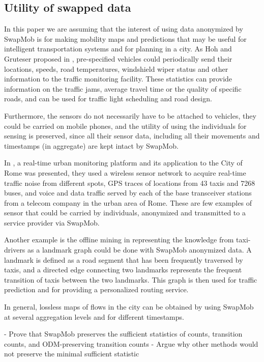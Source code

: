 \documentclass{llncs}
\begin{document}
\subsection{Utility of swapped data}\label{sect:util}
In this paper we are assuming that the interest of using data anonymized by SwapMob is for making mobility maps and predictions that may be useful for intelligent transportation systems and for planning in a city.
As Hoh and Gruteser proposed in \cite{Hoh2005}, pre-specified vehicles could periodically send their locations, speeds, road temperatures, windshield wiper status and other information to the traffic monitoring facility. These statistics can provide information on the traffic jams, average travel time or the quality of specific roads, and can be used for traffic light scheduling and road design.

Furthermore, the sensors do not necessarily have to be attached to vehicles, they could be carried on mobile phones, and the utility of using the individuals for sensing is preserved, since all their sensor data, including all their movements and timestamps (in aggregate) are kept intact by SwapMob.


In \cite{Calabrese2011}, a real-time urban monitoring platform and its application to the City of Rome was presented, they used
a wireless sensor network to acquire real-time traffic noise from different spots, GPS traces of locations from 43 taxis and 7268 buses, and voice and data traffic served by each of the base transceiver stations from a telecom company in the urban area of Rome. These are few examples of sensor that could be carried by individuals, anonymized and transmitted to a service provider via SwapMob.


Another example is the offline mining in \cite{Yuan2011} representing the knowledge from taxi-drivers as a landmark graph could be done with SwapMob anonymized data. A landmark is defined as a road segment that has been frequently traversed by taxis, and a directed edge connecting two landmarks represents the frequent transition of taxis between the two landmarks. This graph is then used for traffic prediction and for providing a personalized routing service.


In general, lossless maps of flows in the city can be obtained by using SwapMob at several aggregation levels and for different timestamps.

- Prove that SwapMob preserves the sufficient statistics of counts, transition counts, and ODM-preserving transition counts
- Argue why other methods would not preserve the minimal sufficient statistic
\end{document}
